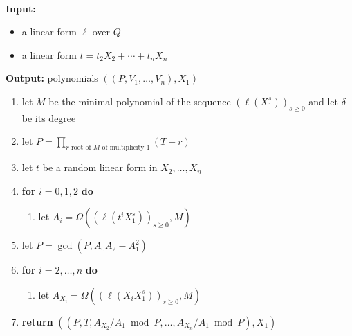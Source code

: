 \documentclass[12pt]{article}
\begin{document}
\begin{algorithm}[H]
	\caption{$\mathsf{ParametrizationX}_1(\ell,t)$}
	~\\
	{\bf Input:} \vspace{-0.5em}
	\begin{itemize}\setlength\itemsep{0em}
		\item a linear form $\ell$ over $Q$
		\item a linear form $t=t_2 X_2 + \cdots + t_n X_n$
	\end{itemize}
	{\bf Output:} polynomials $((P,V_1,\dots,V_n),X_1)$
	\begin{enumerate}\setlength\itemsep{0em}
		\item let $M$ be the minimal polynomial of the sequence $(\ell(X_1^s))_{s \ge 0}$ and let $\delta$ be its degree
		\item let $P = \prod_{r \text{~root of $M$ of multiplicity 1}}(T-r)$
		\item let $t$ be a random linear form in $X_2,\dots,X_n$
		\item \textbf{for} $i=0,1,2$ \textbf{do}
		\begin{enumerate}
			\item let $A_i = \Omega((\ell(t^i X_1^s))_{s\ge0},M)$
		\end{enumerate}
		\item\label{step:updateP} let $P = \gcd(P, A_0  A_2- A_1^2)$
		\item \textbf{for} $i=2,\dots,n$ \textbf{do}
		\begin{enumerate}
			\item let $A_{X_i} = \Omega((\ell(X_i X_1^s))_{s\ge0},M)$
		\end{enumerate}
		\item \textbf{return} $((P,T,A_{X_2}/ A_1 \bmod P, \dots,A_{X_n}/A_{1} \bmod P),X_1)$
	\end{enumerate}
	\label{algo:para}
\end{algorithm}
\end{document}
